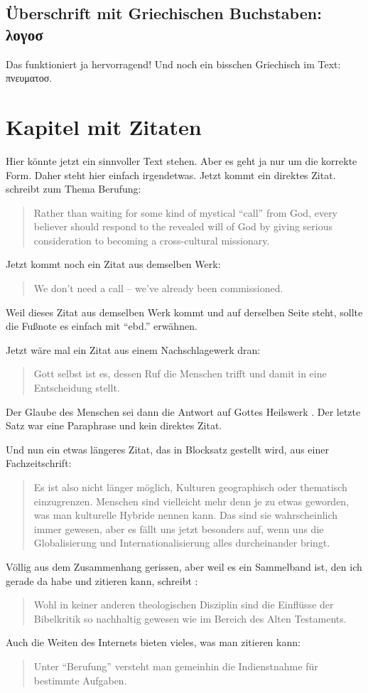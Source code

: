 \documentclass{scrreport}
\begin{document}
\section{Überschrift mit Griechischen Buchstaben: λογοσ}
Das funktioniert ja hervorragend! Und noch ein bisschen Griechisch im Text: πνευματοσ.

\chapter{Kapitel mit Zitaten}
Hier könnte jetzt ein sinnvoller Text stehen. Aber es geht ja nur um die korrekte Form. Daher steht hier einfach irgendetwas. Jetzt kommt ein direktes Zitat. \citeauthor*{friesen} schreibt zum Thema Berufung: \blockcquote[][330]{friesen}{Rather than waiting for some kind of mystical \enquote{call} from God, every believer should respond to the revealed will of God by giving serious consideration to becoming a cross-cultural missionary.} Jetzt kommt noch ein Zitat aus demselben Werk: \blockcquote[][330]{friesen}{We don't need a call -- we've already been commissioned.} Weil dieses Zitat aus demselben Werk kommt und auf derselben Seite steht, sollte die Fußnote es einfach mit \enquote{ebd.} erwähnen.

Jetzt wäre mal ein Zitat aus einem Nachschlagewerk dran: \blockcquote[][80]{rienecker}{Gott selbst ist es, dessen Ruf die Menschen trifft und damit in eine Entscheidung stellt.} Der Glaube des Menschen sei dann die Antwort auf Gottes Heilswerk \autocite[Vgl.][]{rienecker}. Der letzte Satz war eine Paraphrase und kein direktes Zitat.

Und nun ein etwas längeres Zitat, das in Blocksatz gestellt wird, aus einer Fachzeitschrift: \blockcquote[][]{dahl}{Es ist also nicht länger möglich, Kulturen geographisch oder thematisch einzugrenzen. Menschen sind vielleicht mehr denn je zu etwas geworden, was man kulturelle Hybride nennen kann. Das sind sie wahrscheinlich immer gewesen, aber es fällt uns jetzt besonders auf, wenn uns die Globalisierung und Internationalisierung alles durch\-einander bringt.}

Völlig aus dem Zusammenhang gerissen, aber weil es ein Sammelband ist, den ich gerade da habe und zitieren kann, schreibt \citeauthor*{hilbrands}: \blockcquote[][49]{hilbrands}{Wohl in keiner anderen theologischen Disziplin sind die Einflüsse der Bibelkritik so nachhaltig gewesen wie im Bereich des Alten Testaments.}

Auch die Weiten des Internets bieten vieles, was man zitieren kann: \blockcquote[][]{strecker}{Unter \enquote{Berufung} versteht man gemeinhin die \textelp{} Indienstnahme für bestimmte Aufgaben.}

\newpage
\printbibliography[title=Literaturverzeichnis]
\end{document}
